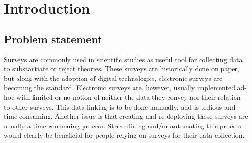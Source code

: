 \chapter{Introduction}
\section{Problem statement}
Surveys are commonly used in scientific studies as useful tool for collecting data to substantiate or reject theories. These surveys are historically done on paper, but along with the adoption of digital technologies, electronic surveys are becoming the standard.
Electronic surveys are, however, usually implemented ad-hoc with limited or no notion of neither the data they convey nor their relation to other surveys. This data-linking is to be done manually, and is tedious and time consuming. Another issue is that creating and re-deploying these surveys are usually a time-consuming process.
Streamlining and/or automating this process would clearly be beneficial for people relying on surveys for their data collection.